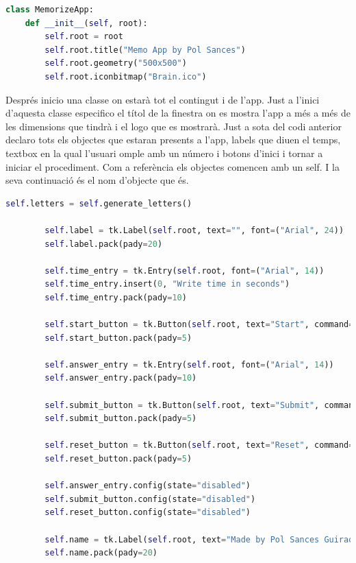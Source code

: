 \begin{lstlisting}[language=Python, style=colorEX, caption=Inici de la classe i especificació de la finestra]
class MemorizeApp:    
    def __init__(self, root):
        self.root = root
        self.root.title("Memo App by Pol Sances")
        self.root.geometry("500x500")
        self.root.iconbitmap("Brain.ico")
\end{lstlisting}

Després inicio una classe on estarà tot el contingut i de l'app. Just a l'inici d'aquesta classe
especifico el títol de la finestra on es mostra l'app a més a més de les dimensions que tindrà i
el logo que es mostrarà. Just a sota del codi anterior declaro tots els objectes que estaran presents a l'app, labels que
diuen el temps, textbox en la qual l'usuari omple amb un número i botons d'inici i tornar a iniciar
el procediment. Com a referència els objectes comencen amb un self. I la seva continuació és
el nom d'objecte que és. 

\begin{lstlisting}[language=Python, style=colorEX, caption=Declaració d'objectes necessaris pel funcionament de l'App]
        self.letters = self.generate_letters()

        self.label = tk.Label(self.root, text="", font=("Arial", 24))
        self.label.pack(pady=20)

        self.time_entry = tk.Entry(self.root, font=("Arial", 14))
        self.time_entry.insert(0, "Write time in seconds")
        self.time_entry.pack(pady=10)

        self.start_button = tk.Button(self.root, text="Start", command=self.start_memorize)
        self.start_button.pack(pady=5)

        self.answer_entry = tk.Entry(self.root, font=("Arial", 14))
        self.answer_entry.pack(pady=10)

        self.submit_button = tk.Button(self.root, text="Submit", command=self.check_answers)
        self.submit_button.pack(pady=5)

        self.reset_button = tk.Button(self.root, text="Reset", command=self.reset)
        self.reset_button.pack(pady=5)

        self.answer_entry.config(state="disabled")
        self.submit_button.config(state="disabled")
        self.reset_button.config(state="disabled")

        self.name = tk.Label(self.root, text="Made by Pol Sances Guirao", font=("Arial", 8))
        self.name.pack(pady=20)
\end{lstlisting}

